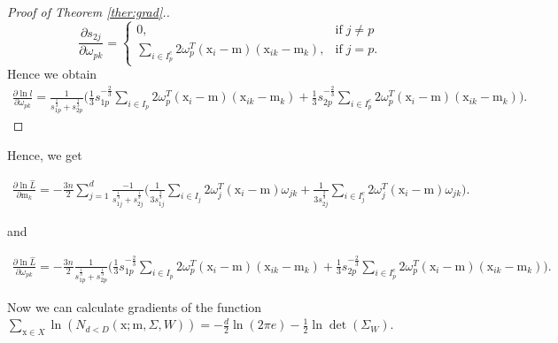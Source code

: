 \documentclass[12pt]{article}
\def\w{\omega}
\def\x{\mathrm{x}}
\def\m{\mathrm{m}}
\theoremstyle{definition}
\begin{document}
\begin{proof}[Proof of Theorem \ref{ther:grad}.]
$$\frac{\partial {s}_{2j}}{\partial \w_{pk}} = \left\{ \begin{array}{ll}
0, & \text{if} \; j\neq p\\
\sum\limits_{ i \in {I}_p^c} 2 \w^T_p (\x_i - \m) (\x_{ik} - \m_k), & \text{if} \; j=p.
\end{array} \right.
$$
Hence we obtain %
$$
\begin{array}{l}
\frac{\partial \ln {l}}{\partial \w_{pk}} = \frac{1}{{s}_{1p}^{\frac{1}{3}} +{s}_{2p}^{\frac{1}{3}}} 
 \bigg(
\frac{1}{3} {s}_{1p}^{-\frac{2}{3}} \sum\limits_{ i \in {I}_p} 2 \w^T_p (\x_i - \m) (\x_{ik} - \m_k)
+ \frac{1}{3} {s}_{2p}^{-\frac{2}{3}} \sum\limits_{ i \in {I}_p^c} 2 \w^T_p (\x_i - \m) (\x_{ik} - \m_k) \bigg).
\end{array}
$$
\end{proof}

Hence, we get

$$
\begin{array}{l}
\frac{\partial \ln {\hat{L}}}{\partial \m_k} = -\frac{3n}{2} \sum\limits_{j=1}^d \frac{-1}{{s}_{1j}^{\frac{1}{3}} + {s}_{2j}^{\frac{1}{3}}} \bigg(
\frac{1}{3 {s}_{1j}^{\frac{2}{3}}} \sum\limits_{i \in I_j} 2 \w_j^T (\x_i - \m)  \w_{jk} +%
\frac{1}{3 {s}_{2j}^{\frac{2}{3}}} \sum\limits_{i \in I_j^c} 2 \w_j^T (\x_i - \m) \w_{jk}
\bigg).
\end{array}
$$

and

$$
\begin{array}{l}
\frac{\partial \ln {\hat{L}}}{\partial \w_{pk}} = -\frac{3n}{2} \frac{1}{{s}_{1p}^{\frac{1}{3}} +{s}_{2p}^{\frac{1}{3}}} 
 \bigg(
\frac{1}{3} {s}_{1p}^{-\frac{2}{3}} \sum\limits_{ i \in {I}_p} 2 \w^T_p (\x_i - \m) (\x_{ik} - \m_k)
+ \frac{1}{3} {s}_{2p}^{-\frac{2}{3}} \sum\limits_{ i \in {I}_p^c} 2 \w^T_p (\x_i - \m) (\x_{ik} - \m_k) \bigg).
\end{array}
$$


Now we can calculate gradients of the function $\sum \limits_{\x \in X} \ln(N_{d<D}(\x;\m,\Sigma,W)) = -\frac{d}{2}\ln(2\pi e)-\frac{1}{2}\ln \det(\Sigma_{W})$.
\end{document}

